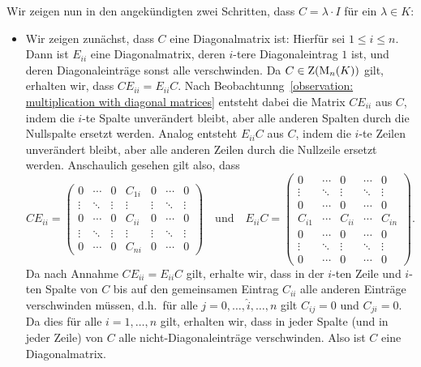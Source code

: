 Wir zeigen nun in den angekündigten zwei Schritten, dass $C = \lambda \cdot I$ für ein $\lambda \in K$:
\begin{itemize}
  \item
    Wir zeigen zunächst, dass $C$ eine Diagonalmatrix ist:
    Hierfür sei $1 \leq i \leq n$.
    Dann ist $E_{ii}$ eine Diagonalmatrix, deren $i$-tere Diagonaleintrag $1$ ist, und deren Diagonaleinträge sonst alle verschwinden.
    Da $C \in \operatorname{Z}(\operatorname{M}_{n}(K))$ gilt, erhalten wir, dass $C E_{ii} = E_{ii} C$.
    Nach Beobachtunng~\ref{observation: multiplication with diagonal matrices} entsteht dabei die Matrix $C E_{ii}$ aus $C$, indem die $i$-te Spalte unverändert bleibt, aber alle anderen Spalten durch die Nullspalte ersetzt werden.
    Analog entsteht $E_{ii} C$ aus $C$, indem die $i$-te Zeilen unverändert bleibt, aber alle anderen Zeilen durch die Nullzeile ersetzt werden.
    Anschaulich gesehen gilt also, dass
    \[
      C E_{ii}
      =
      \begin{pmatrix}
        0       & \cdots  & 0       & C_{1i}    & 0       & \cdots  & 0       \\
        \vdots  & \ddots  & \vdots  & \vdots    & \vdots  & \ddots  & \vdots  \\
        0       & \cdots  & 0       & C_{ii}    & 0       & \cdots  & 0       \\
        \vdots  & \ddots  & \vdots  & \vdots    & \vdots  & \ddots  & \vdots  \\
        0       & \cdots  & 0       & C_{ni}    & 0       & \cdots  & 0
      \end{pmatrix}
      \quad\text{und}\quad
      E_{ii} C
      = \begin{pmatrix}
        0       & \cdots  & 0       & \cdots  & 0       \\
        \vdots  & \ddots  & \vdots  & \ddots  & \vdots  \\
        0       & \cdots  & 0       & \cdots  & 0       \\
        C_{i1}  & \cdots  & C_{ii}  & \cdots  & C_{in}  \\
        0       & \cdots  & 0       & \cdots  & 0       \\
        \vdots  & \ddots  & \vdots  & \ddots  & \vdots  \\
        0       & \cdots  & 0       & \cdots  & 0
      \end{pmatrix}.
    \]
    Da nach Annahme $C E_{ii} = E_{ii} C$ gilt, erhalte wir, dass in der $i$-ten Zeile und $i$-ten Spalte von $C$ bis auf den gemeinsamen Eintrag $C_{ii}$ alle anderen Einträge verschwinden müssen, d.h.\ für alle $j = 0, \dotsc, \hat{i}, \dotsc, n$ gilt $C_{ij} = 0$ und $C_{ji} = 0$.
    Da dies für alle $i = 1, \dotsc, n$ gilt, erhalten wir, dass in jeder Spalte (und in jeder Zeile) von $C$ alle nicht-Diagonaleinträge verschwinden.
    Also ist $C$ eine Diagonalmatrix.
    

\end{itemize}
